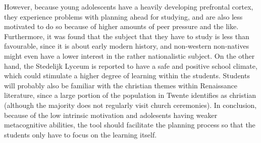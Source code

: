 However, because young adolescents have a heavily developing prefrontal cortex, they experience problems with planning ahead for studying, and are also less motivated to do so because of higher amounts of peer pressure and the like. Furthermore, it was found that the subject that they have to study is less than favourable, since it is about early modern history, and non-western non-natives might even have a lower interest in the rather nationalistic subject. On the other hand, the Stedelijk Lyceum is reported to have a safe and positive school climate, which could stimulate a higher degree of learning within the students. Students will probably also be familiar with the christian themes within Renaissance literature, since a large portion of the population in Twente identifies as christian (although the majority does not regularly visit church ceremonies). In conclusion, because of the low intrinsic motivation and adolesents having weaker metacognitive abilities, the tool should facilitate the planning process so that the students only have to focus on the learning itself.
